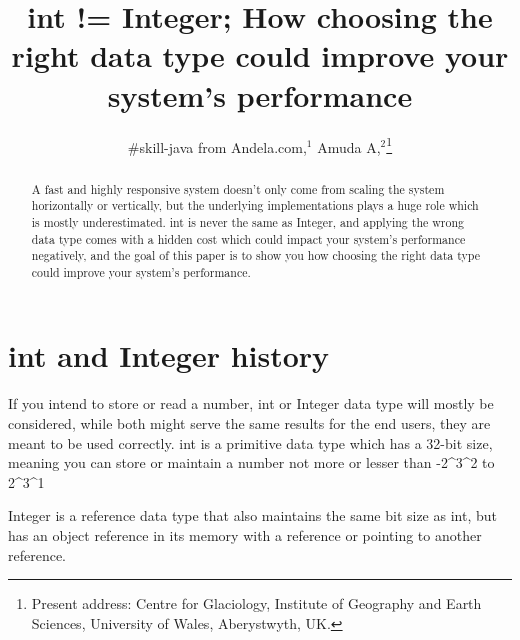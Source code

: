 \documentclass[aog]{igs}
\begin{document}
\title[IGS \LaTeXe\ guide]{int != Integer; How choosing the right data type could improve your system's performance}

\author[Baxter and others]{#skill-java from Andela.com,$^1$
  Amuda A,$^2$\protect\thanks{Present address:
  Centre for Glaciology, Institute of Geography and
  Earth Sciences, University of Wales, Aberystwyth,
  UK.}}


\begin{frontmatter}

\maketitle

\begin{abstract}

A fast and highly responsive system doesn't only come from scaling the system horizontally or vertically, but the underlying implementations
plays a huge role which is mostly underestimated. int is never the same as Integer, and applying the wrong data type comes with a hidden cost which could impact your system's performance negatively, and the goal of this paper is to show you how choosing the right data type could improve your system's performance.
\end{abstract}

\end{frontmatter}


\section{int and Integer history}

If you intend to store or read a number, int or Integer data type will mostly be considered, while both might serve the same results for the end users,
they are meant to be used correctly. int is a primitive data type which has a 32-bit size, meaning you can store or maintain a number not more or lesser than -2^3^2 to 2^3^1

Integer is a reference data type that also maintains the same bit size as int, but has an object reference in its memory with a reference or
pointing to another reference.
\end{document}
